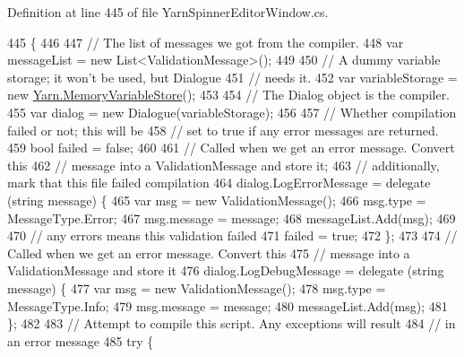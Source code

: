 Definition at line 445 of file Yarn\-Spinner\-Editor\-Window.\-cs.


\begin{DoxyCode}
445                                                                                                            
                        \{
446 
447             \textcolor{comment}{// The list of messages we got from the compiler.}
448             var messageList = \textcolor{keyword}{new} List<ValidationMessage>();
449 
450             \textcolor{comment}{// A dummy variable storage; it won't be used, but Dialogue}
451             \textcolor{comment}{// needs it.}
452             var variableStorage = \textcolor{keyword}{new} \hyperlink{a00138}{Yarn.MemoryVariableStore}();
453 
454             \textcolor{comment}{// The Dialog object is the compiler.}
455             var dialog = \textcolor{keyword}{new} Dialogue(variableStorage);
456 
457             \textcolor{comment}{// Whether compilation failed or not; this will be}
458             \textcolor{comment}{// set to true if any error messages are returned.}
459             \textcolor{keywordtype}{bool} failed = \textcolor{keyword}{false};
460 
461             \textcolor{comment}{// Called when we get an error message. Convert this}
462             \textcolor{comment}{// message into a ValidationMessage and store it;}
463             \textcolor{comment}{// additionally, mark that this file failed compilation}
464             dialog.LogErrorMessage = delegate (\textcolor{keywordtype}{string} message) \{
465                 var msg = \textcolor{keyword}{new} ValidationMessage();
466                 msg.type = MessageType.Error;
467                 msg.message = message;
468                 messageList.Add(msg);
469 
470                 \textcolor{comment}{// any errors means this validation failed}
471                 failed = \textcolor{keyword}{true};
472             \};
473 
474             \textcolor{comment}{// Called when we get an error message. Convert this}
475             \textcolor{comment}{// message into a ValidationMessage and store it}
476             dialog.LogDebugMessage = delegate (\textcolor{keywordtype}{string} message) \{
477                 var msg = \textcolor{keyword}{new} ValidationMessage();
478                 msg.type = MessageType.Info;
479                 msg.message = message;
480                 messageList.Add(msg);
481             \};
482 
483             \textcolor{comment}{// Attempt to compile this script. Any exceptions will result}
484             \textcolor{comment}{// in an error message}
485             \textcolor{keywordflow}{try} \{

\end{DoxyCode}

